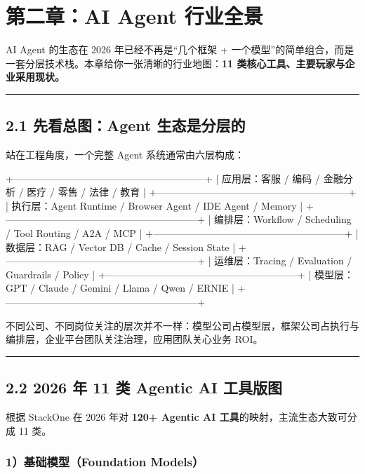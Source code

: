 \chapter{第二章：AI Agent 行业全景}

AI Agent 的生态在 2026 年已经不再是``几个框架 + 一个模型''的简单组合，而是一套分层技术栈。本章给你一张清晰的行业地图：\textbf{11 类核心工具、主要玩家与企业采用现状。}


\bigskip\hrule\bigskip

\section{2.1 先看总图：Agent 生态是分层的}

站在工程角度，一个完整 Agent 系统通常由六层构成：


\begin{codeblock}
+-----------------------------------------------------------+
| 应用层：客服 / 编码 / 金融分析 / 医疗 / 零售 / 法律 / 教育 |
+-----------------------------------------------------------+
| 执行层：Agent Runtime / Browser Agent / IDE Agent / Memory |
+-----------------------------------------------------------+
| 编排层：Workflow / Scheduling / Tool Routing / A2A / MCP  |
+-----------------------------------------------------------+
| 数据层：RAG / Vector DB / Cache / Session State           |
+-----------------------------------------------------------+
| 运维层：Tracing / Evaluation / Guardrails / Policy        |
+-----------------------------------------------------------+
| 模型层：GPT / Claude / Gemini / Llama / Qwen / ERNIE      |
+-----------------------------------------------------------+
\end{codeblock}

不同公司、不同岗位关注的层次并不一样：模型公司占模型层，框架公司占执行与编排层，企业平台团队关注治理，应用团队关心业务 ROI。


\bigskip\hrule\bigskip

\section{2.2 2026 年 11 类 Agentic AI 工具版图}

根据 StackOne 在 2026 年对 \textbf{120+ Agentic AI 工具}的映射，主流生态大致可分成 11 类。


\subsection{1）基础模型（Foundation Models）}

